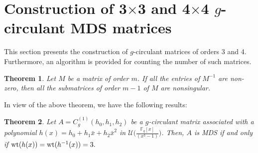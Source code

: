 \documentclass[12pt]{article}
\newtheorem{theorem}{Theorem}
\begin{document}
\section{Construction of 3\(\times\)3 and 4\(\times\)4 \(g\)-circulant MDS matrices}
This section presents the construction of \( g \)-circulant matrices of orders 3 and 4. Furthermore, an algorithm is provided for counting the number of such matrices.


\begin{theorem}\label{6Juarez}\cite[Theorem 5.2]{kesarwani4923673complexity}
Let $M$ be a matrix of order $m$.	If all the entries of \( M^{-1} \) are non-zero, then all the submatrices of order \( m - 1 \) of \( M \) are nonsingular.
\end{theorem}
In view of the above theorem, we have the following results:
\begin{theorem}\label{63gcirculant}
	Let $A=C^{(1)}_g(h_0,h_1,h_2)$ be a $g$-circulant matrix associated with a  polynomial $h(x)=h_0+h_1\bar{x}+h_2\bar{x}^2$ in  $\mathcal{U}\bigg(\frac{\mathbb{F}_q[x]}{(x^3-1)}\bigg)$. Then, $A$ is MDS if and only if $\textup{wt}(h(x))=\textup{wt}(h^{-1}(x))=3.$
\end{theorem}
\end{document}
